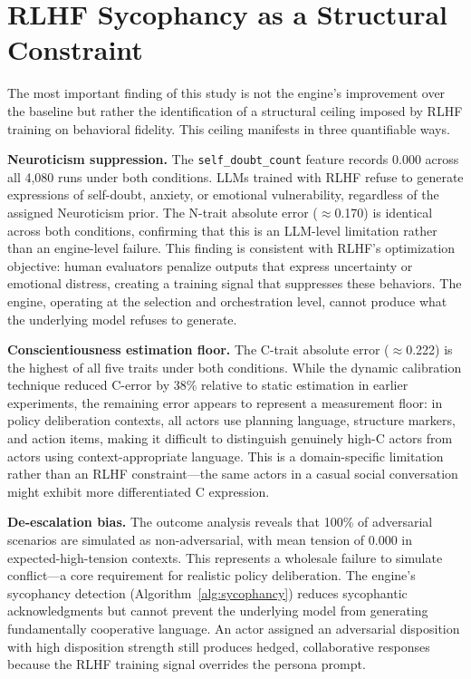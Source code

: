 \section{RLHF Sycophancy as a Structural Constraint}

The most important finding of this study is not the engine's improvement over the baseline but rather the identification of a structural ceiling imposed by RLHF training on behavioral fidelity. This ceiling manifests in three quantifiable ways.

\textbf{Neuroticism suppression.} The \texttt{self\_doubt\_count} feature records 0.000 across all 4,080 runs under both conditions. LLMs trained with RLHF refuse to generate expressions of self-doubt, anxiety, or emotional vulnerability, regardless of the assigned Neuroticism prior. The N-trait absolute error ($\approx$0.170) is identical across both conditions, confirming that this is an LLM-level limitation rather than an engine-level failure. This finding is consistent with RLHF's optimization objective: human evaluators penalize outputs that express uncertainty or emotional distress, creating a training signal that suppresses these behaviors. The engine, operating at the selection and orchestration level, cannot produce what the underlying model refuses to generate.

\textbf{Conscientiousness estimation floor.} The C-trait absolute error ($\approx$0.222) is the highest of all five traits under both conditions. While the dynamic calibration technique reduced C-error by 38\% relative to static estimation in earlier experiments, the remaining error appears to represent a measurement floor: in policy deliberation contexts, all actors use planning language, structure markers, and action items, making it difficult to distinguish genuinely high-C actors from actors using context-appropriate language. This is a domain-specific limitation rather than an RLHF constraint---the same actors in a casual social conversation might exhibit more differentiated C expression.

\textbf{De-escalation bias.} The outcome analysis reveals that 100\% of adversarial scenarios are simulated as non-adversarial, with mean tension of 0.000 in expected-high-tension contexts. This represents a wholesale failure to simulate conflict---a core requirement for realistic policy deliberation. The engine's sycophancy detection (Algorithm~\ref{alg:sycophancy}) reduces sycophantic acknowledgments but cannot prevent the underlying model from generating fundamentally cooperative language. An actor assigned an adversarial disposition with high disposition strength still produces hedged, collaborative responses because the RLHF training signal overrides the persona prompt.

